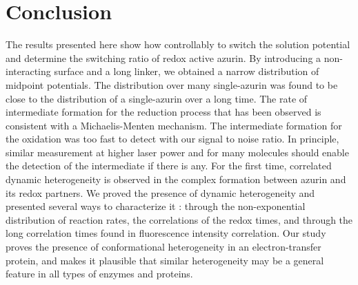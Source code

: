 
\section{Conclusion}
The results presented here show how controllably to switch the solution potential and determine the switching ratio of redox active azurin.
By introducing a non-interacting surface and a long linker, we obtained a narrow distribution of midpoint potentials.
The distribution over many single-azurin was found to be close to the distribution of a single-azurin over a long time.
The rate of intermediate formation for the reduction process that has been observed is consistent with a Michaelis-Menten mechanism.
The intermediate formation for the oxidation was too fast to detect with our signal to noise ratio.
In principle, similar measurement at higher laser power and for many molecules should enable the detection of the intermediate if there is any.
For the first time, correlated dynamic heterogeneity is observed in the complex formation between azurin and its redox partners.
We proved the presence of dynamic heterogeneity and presented several ways to characterize it : through the non-exponential distribution of reaction rates, the correlations of the redox times, and through the long correlation times found in fluorescence intensity correlation.
Our study proves the presence of conformational heterogeneity in an electron-transfer protein, and makes it plausible that similar heterogeneity may be a general feature in all types of enzymes and proteins.

